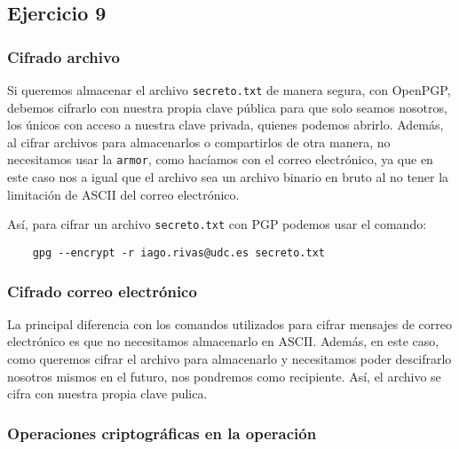 \subsection{Ejercicio 9}
\graphicspath{ {img/09} }

\subsubsection{Cifrado archivo}

Si queremos almacenar el archivo \texttt{secreto.txt} de manera segura, con OpenPGP, debemos cifrarlo con nuestra propia clave pública para que solo seamos nosotros, los únicos con acceso a nuestra clave privada, quienes podemos abrirlo. Además, al cifrar archivos para almacenarlos o compartirlos de otra manera, no necesitamos usar la \texttt{armor}, como hacíamos con el correo electrónico, ya que en este caso nos a igual que el archivo sea un archivo binario en bruto al no tener la limitación de ASCII del correo electrónico.

Así, para cifrar un archivo \texttt{secreto.txt} con PGP podemos usar el comando:

\begin{verbatim}
    gpg --encrypt -r iago.rivas@udc.es secreto.txt
\end{verbatim}

\subsubsection{Cifrado correo electrónico}

La principal diferencia con los comandos utilizados para cifrar mensajes de correo electrónico es que no necesitamos almacenarlo en ASCII. Además, en este caso, como queremos cifrar el archivo para almacenarlo y necesitamos poder descifrarlo nosotros mismos en el futuro, nos pondremos como recipiente. Así, el archivo se cifra con nuestra propia clave pulica.

\subsubsection{Operaciones criptográficas en la operación}

